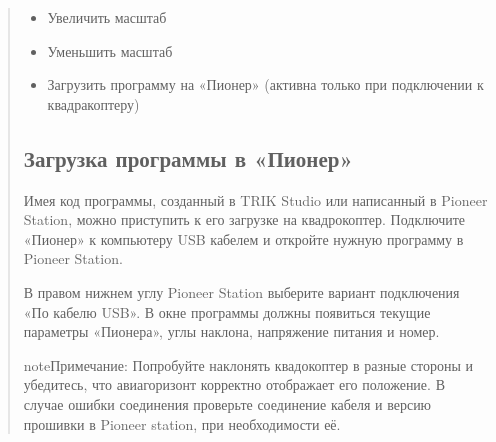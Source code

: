 \documentclass[a4paper,10pt,russian]{sphinxmanual}
\begin{document}
\begin{quote}
\begin{itemize}
\begin{description}
\end{description}

\item {} \begin{description}
\item[{Увеличить масштаб}] \leavevmode
\noindent{}

\end{description}

\item {} \begin{description}
\item[{Уменьшить масштаб}] \leavevmode
\noindent{}

\end{description}

\item {} \begin{description}
\item[{Загрузить программу на «Пионер» (активна только при подключении к квадракоптеру)}] \leavevmode
\noindent{}

\end{description}

\end{itemize}


\subsection{Загрузка программы в «Пионер»}
\label{\detokenize{programming/pioneer_station/pioneer_station_upload:id1}}\label{\detokenize{programming/pioneer_station/pioneer_station_upload::doc}}
Имея код программы, созданный в TRIK Studio или написанный в Pioneer Station, можно приступить к его загрузке на квадрокоптер.
Подключите «Пионер» к компьютеру USB кабелем и откройте нужную программу в Pioneer Station.

В правом нижнем углу Pioneer Station выберите вариант подключения «По кабелю USB». В окне программы должны появиться текущие параметры «Пионера», углы наклона, напряжение питания и номер.


\begin{sphinxadmonition}{note}{Примечание:}
Попробуйте наклонять квадокоптер в разные стороны и убедитесь, что авиагоризонт корректно отображает его положение. В случае ошибки соединения проверьте соединение кабеля и версию прошивки в Pioneer station, при необходимости  её.
\end{sphinxadmonition}


\end{quote}
\end{document}

